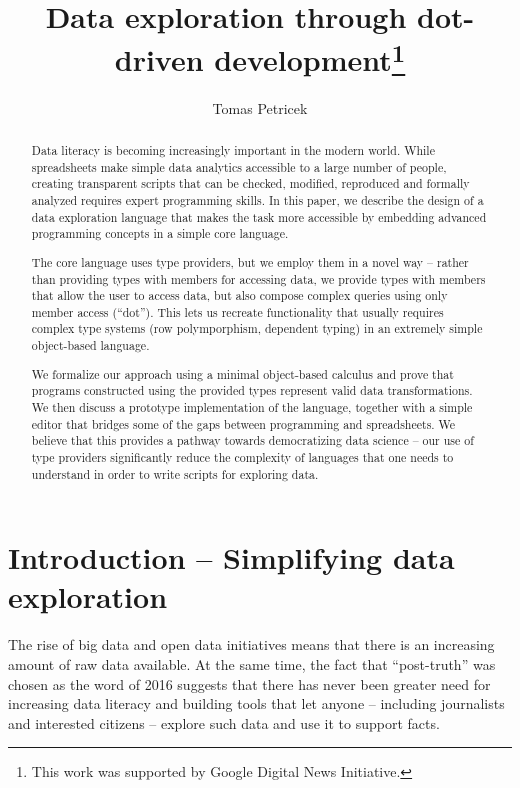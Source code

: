 \documentclass[a4paper,UKenglish]{lipics-v2016}
\title{Data exploration through dot-driven development\footnote{This 
  work was supported by Google Digital News Initiative.}}
\author[1]{Tomas Petricek}
\affil[1]{The Alan Turing Institute, London, UK\\
  \texttt{tomas@tomasp.net}}
\begin{document}
\maketitle

\begin{abstract}
Data literacy is becoming increasingly important in the modern world. While spreadsheets make 
simple data analytics accessible to a large number of people, creating transparent scripts that 
can be checked, modified, reproduced and formally analyzed requires expert programming skills. 
In this paper, we describe the design of a data exploration language that makes the task more 
accessible by embedding advanced programming concepts in a simple core language.

The core language uses type providers, but we employ them in a novel way -- rather than providing 
types with members for accessing data, we provide types with members that allow the user to access 
data, but also compose complex queries using only member access (``dot''). This lets us recreate 
functionality that usually requires complex type systems (row polymporphism, dependent typing) 
in an extremely simple object-based language.

We formalize our approach using a minimal object-based calculus and prove that
programs constructed using the provided types represent valid data transformations. We then discuss 
a prototype implementation of the language, together with a simple editor that bridges
some of the gaps between programming and spreadsheets. We believe that this provides a pathway towards
democratizing data science -- our use of type providers significantly reduce the complexity of 
languages that one needs to understand in order to write scripts for exploring data.
\end{abstract}


\section{Introduction -- Simplifying data exploration}
\label{sec:intro}

The rise of big data and open data initiatives means that there is an increasing amount of raw data 
available. At the same time, the fact that ``post-truth'' was chosen as the word of 2016 suggests 
that there has never been greater need for increasing data literacy and building tools that let 
anyone -- including journalists and interested citizens -- explore such data and use it to support facts.
\end{document}
